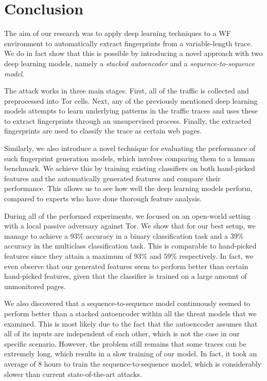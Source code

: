 \chapter{Conclusion}

The aim of our research was to apply deep learning techniques to a WF environment to automatically extract fingerprints from a variable-length trace.
We do in fact show that this is possible by introducing a novel approach with two deep learning models, namely a \textit{stacked autoencoder} and a \textit{sequence-to-sequence model}.

The attack works in three main stages.
First, all of the traffic is collected and preprocessed into Tor cells.
Next, any of the previously mentioned deep learning models attempts to learn underlying patterns in the traffic traces and uses these to extract fingerprints through an unsupervised process.
Finally, the extracted fingerprints are used to classify the trace as certain web pages.

Similarly, we also introduce a novel technique for evaluating the performance of such fingerprint generation models, which involves comparing them to a human benchmark.
We achieve this by training existing classifiers on both hand-picked features and the automatically generated features and compare their performance.
This allows us to see how well the deep learning models perform, compared to experts who have done thorough feature analysis.

During all of the performed experiments, we focused on an open-world setting with a local passive adversary against Tor.
We show that for our best setup, we manage to achieve a $93 \%$ accuracy in a binary classification task and a $39 \%$ accuracy in the multiclass classification task.
This is comparable to hand-picked features since they attain a maximum of $93 \%$ and $59 \%$ respectively.
In fact, we even observe that our generated features seem to perform better than certain hand-picked features, given that the classifier is trained on a large amount of unmonitored pages.

We also discovered that a sequence-to-sequence model continuously seemed to perform better than a stacked autoencoder within all the threat models that we examined.
This is most likely due to the fact that the autoencoder assumes that all of its inputs are independent of each other, which is not the case in our specific scenario.
However, the problem still remains that some traces can be extremely long, which results in a slow training of our model.
In fact, it took an average of $8$ hours to train the sequence-to-sequence model, which is considerably slower than current state-of-the-art attacks.

